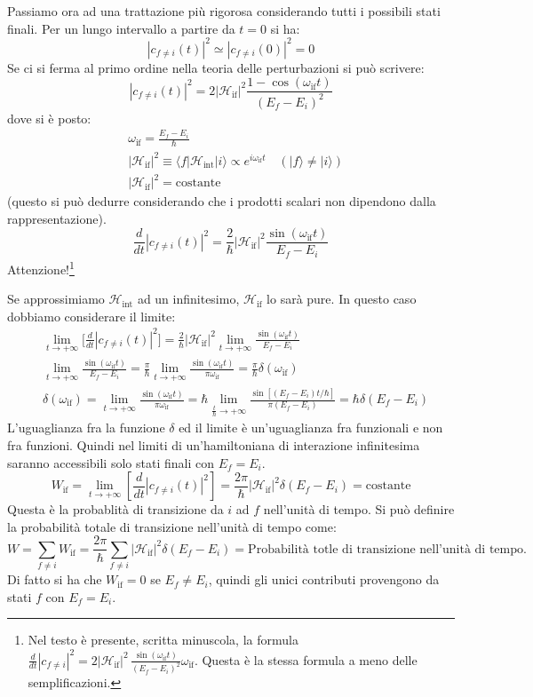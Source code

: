 Passiamo ora ad una trattazione più rigorosa considerando tutti i possibili stati finali. Per un lungo intervallo a partire da $t=0$ si ha:
\[
|c_{f\neq i}(t)|^2\simeq |c_{f\neq i}(0)|^2=0
\]
Se ci si ferma al primo ordine nella teoria delle perturbazioni si può scrivere:
\[
|c_{f\neq i}(t)|^2=2|\mathcal{H}_{\text{if}}|^2\frac{1-\cos(\omega_{\text{if}}t)}{(E_f-E_i)^2}
\]
dove si è posto:
\begin{align*}
&\omega_{\text{if}}=\frac{E_f-E_i}{\hbar}\\
&|\mathcal{H}_{\text{if}}|^2\equiv\langle f|\mathcal{H}_{\text{int}}|i\rangle\propto e^{i\omega_{\text{if}}t}\quad (|f\rangle\neq|i\rangle)\\
&|\mathcal{H}_{\text{if}}|^2=\text{costante}
\end{align*}
(questo si può dedurre considerando che i prodotti scalari non dipendono dalla rappresentazione).
\[
\frac{d}{dt}|c_{f\neq i}(t)|^2=\frac{2}{\hbar}|\mathcal{H}_{\text{if}}|^2\frac{\sin(\omega_{\text{if}}t)}{E_f-E_i}
\]
Attenzione!\footnote{Nel testo è presente, scritta minuscola, la formula
  $\frac{d}{dt}|c_{f\neq
  i}|^2=2|\mathcal{H}_{\text{if}}|^2\,\frac{\sin(\omega_{\text{if}}t)}{(E_f-E_i)^2}\omega_{\text{if}}$.
Questa è la stessa formula a meno delle semplificazioni.}

Se approssimiamo $\mathcal{H}_{\text{int}}$ ad un infinitesimo, $\mathcal{H}_{\text{if}}$ lo sarà pure.
In questo caso dobbiamo considerare il limite:
\begin{align*}
&\lim_{t\rightarrow+\infty}\bigl[\frac{d}{dt}|c_{f\neq i}(t)|^2\bigr]=\frac{2}{\hbar}|\mathcal{H}_{\text{if}}|^2\lim_{t\rightarrow+\infty}\frac{\sin(\omega_{\text{if}}t)}{E_f-E_i}\\
&\lim_{t\rightarrow+\infty}\frac{\sin(\omega_{\text{if}}t)}{E_f-E_i}=\frac{\pi}{\hbar}\lim_{t\rightarrow+\infty}\frac{\sin(\omega_{\text{if}}t)}{\pi\omega_{\text{if}}}=\frac{\pi}{\hbar}\delta(\omega_{\text{if}})\\
&\delta(\omega_{\text{if}})=\lim_{t\rightarrow+\infty}\frac{\sin(\omega_{\text{if}}t)}{\pi\omega_{\text{if}}}=\hbar\lim_{\frac{t}{\hbar}\rightarrow+\infty}\frac{\sin[(E_f-E_i)t/\hbar]}{\pi(E_f-E_i)}=\hbar\delta(E_f-E_i)
\end{align*}
L'uguaglianza fra la funzione $\delta$ ed il limite è un'uguaglianza fra funzionali e non fra funzioni.
Quindi nel limiti di un'hamiltoniana di interazione infinitesima saranno accessibili solo stati finali con $E_f=E_i$.
\[
W_{\text{if}}=\lim_{t\rightarrow+\infty}[\frac{d}{dt}|c_{f\neq i}(t)|^2]=\frac{2\pi}{\hbar}|\mathcal{H}_{\text{if}}|^2\delta(E_f-E_i)=\text{costante}
\]
Questa è la probablità di transizione  da $i$ ad $f$ nell'unità di tempo. Si può definire la probabilità totale di transizione nell'unità di tempo come:
\[
W=\sum_{f\neq i}W_{\text{if}}=\frac{2\pi}{\hbar}\sum_{f\neq i}|\mathcal{H}_{\text{if}}|^2\delta(E_f-E_i)=\text{Probabilità totle di transizione nell'unità di tempo.}
\]
Di fatto si ha che $W_{\text{if}}=0$ se $E_f\neq E_i$, quindi gli unici contributi provengono da stati $f$ con $E_f=E_i$.

